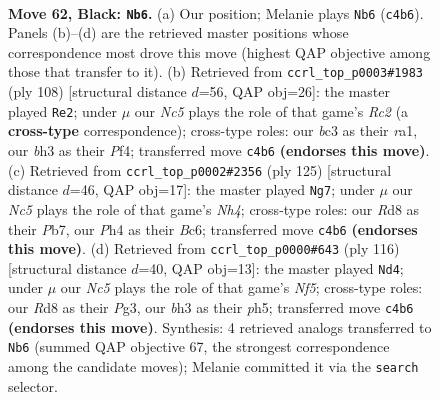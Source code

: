 \documentclass[11pt]{article}
\begin{document}
\clearpage

\begin{figure}[p]\centering
\begin{subfigure}{0.46\textwidth}\centering
\resizebox{\linewidth}{!}{%
\newchessgame
\chessboard[
  setfen={3r4/4b3/p2p2kp/4p3/2n1P2p/2B2P1B/5K2/7R b - - 1 62},
  showmover=false,
  pgfstyle=straightmove, color=movearrow, markmove={c4-b6}
]}
\caption{}
\end{subfigure}\hfill
\begin{subfigure}{0.46\textwidth}\centering
\resizebox{\linewidth}{!}{%
\newchessgame
\chessboard[
  setfen={8/5pk1/4p3/pB3p2/P4P1b/4P2P/2R2PK1/r7 w - - 9 55},
  showmover=false,
  pgfstyle=straightmove, color=movearrow, markmove={c2-e2}
]}
\caption{}
\end{subfigure}
\\[4pt]
\begin{subfigure}{0.46\textwidth}\centering
\resizebox{\linewidth}{!}{%
\newchessgame
\chessboard[
  setfen={8/1p6/2b1kp1p/P2p3n/8/2B1PP2/2B2K2/8 b - - 0 63},
  showmover=false,
  pgfstyle=straightmove, color=movearrow, markmove={h5-g7}
]}
\caption{}
\end{subfigure}\hfill
\begin{subfigure}{0.46\textwidth}\centering
\resizebox{\linewidth}{!}{%
\newchessgame
\chessboard[
  setfen={7k/2b5/2B2p2/p4N1p/P6P/1b2PKP1/8/8 w - - 17 59},
  showmover=false,
  pgfstyle=straightmove, color=movearrow, markmove={f5-d4}
]}
\caption{}
\end{subfigure}
\caption{\textbf{Move 62, Black: \texttt{Nb6}.} (a) Our position; Melanie plays \texttt{Nb6} (\texttt{c4b6}). Panels (b)--(d) are the retrieved master positions whose correspondence most drove this move (highest QAP objective among those that transfer to it). (b) Retrieved from \texttt{ccrl\_top\_p0003\#1983} (ply 108) [structural distance $d$=56, QAP obj=26]: the master played \texttt{Re2}; under $\mu$ our \emph{Nc5} plays the role of that game's \emph{Rc2} (a \textbf{cross-type} correspondence); cross-type roles: our \emph{b}c3 as their \emph{r}a1, our \emph{b}h3 as their \emph{P}f4; transferred move \texttt{c4b6} \textbf{(endorses this move)}. (c) Retrieved from \texttt{ccrl\_top\_p0002\#2356} (ply 125) [structural distance $d$=46, QAP obj=17]: the master played \texttt{Ng7}; under $\mu$ our \emph{Nc5} plays the role of that game's \emph{Nh4}; cross-type roles: our \emph{R}d8 as their \emph{P}b7, our \emph{P}h4 as their \emph{B}c6; transferred move \texttt{c4b6} \textbf{(endorses this move)}. (d) Retrieved from \texttt{ccrl\_top\_p0000\#643} (ply 116) [structural distance $d$=40, QAP obj=13]: the master played \texttt{Nd4}; under $\mu$ our \emph{Nc5} plays the role of that game's \emph{Nf5}; cross-type roles: our \emph{R}d8 as their \emph{P}g3, our \emph{b}h3 as their \emph{p}h5; transferred move \texttt{c4b6} \textbf{(endorses this move)}. Synthesis: 4 retrieved analogs transferred to \texttt{Nb6} (summed QAP objective 67, the strongest correspondence among the candidate moves); Melanie committed it via the \texttt{search} selector.}
\label{fig:thought-m123}
\end{figure}
\end{document}
